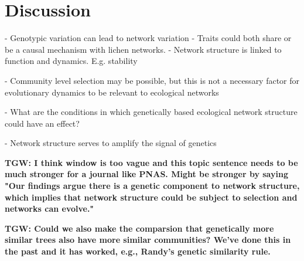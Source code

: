 \documentclass[11pt,twocolumn,twoside,lineno]{pnas-new}
\begin{document}




\showmatmethods{} %


\section*{Discussion}


- Genotypic variation can lead to network variation
- Traits could both share or be a causal mechanism with lichen networks.
- Network structure is linked to function and dynamics. E.g. stability

- Community level selection may be possible, but this is not a
necessary factor for evolutionary dynamics to be relevant to ecological networks

- What are the conditions in which genetically based ecological
network structure could have an effect?

- Network structure serves to amplify the signal of genetics


\textbf{TGW: I think window is too vague and this topic sentence needs
  to be much stronger for a journal like PNAS.  Might be stronger by
  saying "Our findings argue there is a genetic component to network
  structure, which implies that network structure could be subject to
  selection and networks can evolve."}

\textbf{TGW: Could we also make the comparsion that genetically more
  similar trees also have more similar communities?  We've done this
  in the past and it has worked, e.g., Randy's genetic similarity
  rule.}
\end{document}
